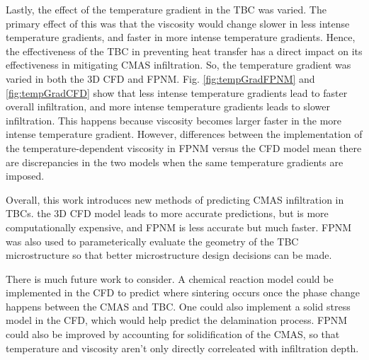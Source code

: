 \documentclass{UCF_ETD}
\begin{document}
Lastly, the effect of the temperature gradient in the TBC was varied. The primary effect of this was that the viscosity would change slower in less intense temperature gradients, and faster in more intense temperature gradients. Hence, the effectiveness of the TBC in preventing heat transfer has a direct impact on its effectiveness in mitigating CMAS infiltration. So, the temperature gradient was varied in both the 3D CFD and FPNM. Fig. \ref{fig:tempGradFPNM} and \ref{fig:tempGradCFD} show that less intense temperature gradients lead to faster overall infiltration, and more intense temperature gradients leads to slower infiltration. This happens because viscosity becomes larger faster in the more intense temperature gradient. However, differences between the implementation of the temperature-dependent viscosity in FPNM versus the CFD model mean there are discrepancies in the two models when the same temperature gradients are imposed.

Overall, this work introduces new methods of predicting CMAS infiltration in TBCs. the 3D CFD model leads to more accurate predictions, but is more computationally expensive, and FPNM is less accurate but much faster. FPNM was also used to parameterically evaluate the geometry of the TBC microstructure so that better microstructure design decisions can be made. 

There is much future work to consider. A chemical reaction model could be implemented in the CFD to predict where sintering occurs once the phase change happens between the CMAS and TBC. One could also implement a solid stress model in the CFD, which would help predict the delamination process. FPNM could also be improved by accounting for solidification of the CMAS, so that temperature and viscosity aren't only directly correleated with infiltration depth.


\end{document}
